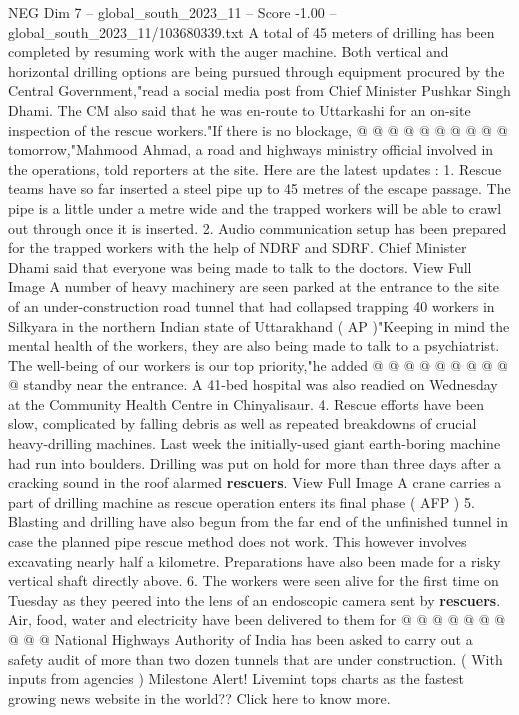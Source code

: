 \begin{textsample}{NEG Dim 7 – global\_south\_2023\_11 – Score -1.00 – global\_south\_2023\_11/103680339.txt}
A total of 45 meters of drilling has been completed by resuming work with the auger machine.
Both vertical and horizontal drilling options are being pursued through equipment procured by the Central Government,"read a social media post from Chief Minister Pushkar Singh Dhami.
The CM also said that he was en-route to Uttarkashi for an on-site inspection of the rescue workers."If there is no blockage, @ @ @ @ @ @ @ @ @ @ tomorrow,"Mahmood Ahmad, a road and highways ministry official involved in the operations, told reporters at the site.
Here are the latest updates : 1.
Rescue teams have so far inserted a steel pipe up to 45 metres of the escape passage.
The pipe is a little under a metre wide and the trapped workers will be able to crawl out through once it is inserted. 2.
Audio communication setup has been prepared for the trapped workers with the help of NDRF and SDRF.
Chief Minister Dhami said that everyone was being made to talk to the doctors.
View Full Image A number of heavy machinery are seen parked at the entrance to the site of an under-construction road tunnel that had collapsed trapping 40 workers in Silkyara in the northern Indian state of Uttarakhand ( AP )"Keeping in mind the mental health of the workers, they are also being made to talk to a psychiatrist.
The well-being of our workers is our top priority,"he added @ @ @ @ @ @ @ @ @ @ standby near the entrance.
A 41-bed hospital was also readied on Wednesday at the Community Health Centre in Chinyalisaur. 4.
Rescue efforts have been slow, complicated by falling debris as well as repeated breakdowns of crucial heavy-drilling machines.
Last week the initially-used giant earth-boring machine had run into boulders.
Drilling was put on hold for more than three days after a cracking sound in the roof alarmed \textbf{rescuers}.
View Full Image A crane carries a part of drilling machine as rescue operation enters its final phase ( AFP ) 5.
Blasting and drilling have also begun from the far end of the unfinished tunnel in case the planned pipe rescue method does not work.
This however involves excavating nearly half a kilometre.
Preparations have also been made for a risky vertical shaft directly above. 6.
The workers were seen alive for the first time on Tuesday as they peered into the lens of an endoscopic camera sent by \textbf{rescuers}.
Air, food, water and electricity have been delivered to them for @ @ @ @ @ @ @ @ @ @ National Highways Authority of India has been asked to carry out a safety audit of more than two dozen tunnels that are under construction. ( With inputs from agencies ) Milestone Alert!
Livemint tops charts as the fastest growing news website in the world??
Click here to know more.

\end{textsample}

